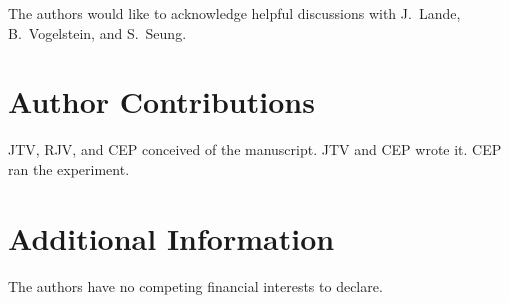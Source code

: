 \documentclass{article}
\begin{document}
The authors would like to acknowledge helpful discussions with J.~Lande, B.~Vogelstein, and S.~Seung. 

\section*{Author Contributions}

JTV, RJV, and CEP conceived of the manuscript.  JTV and CEP wrote it.  CEP ran the experiment.

\section*{Additional Information}

The authors have no competing financial interests to declare.
\end{document}
